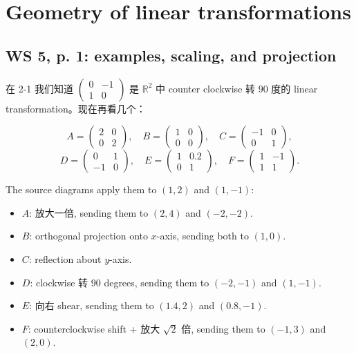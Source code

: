 \chapter{Geometry of linear transformations}

\section{WS 5, p. 1: examples, scaling, and projection}

在 2-1 我们知道 \(\begin{pmatrix}
0 & {- 1} \\
1 & 0
\end{pmatrix}\) 是 \(\mathbb{R}^{2}\) 中 counter clockwise 转 \(90\) 度的 linear transformation。现在再看几个：

\[A = \begin{pmatrix}
2 & 0 \\
0 & 2
\end{pmatrix},\quad B = \begin{pmatrix}
1 & 0 \\
0 & 0
\end{pmatrix},\quad C = \begin{pmatrix}
{- 1} & 0 \\
0 & 1
\end{pmatrix},\]\[D = \begin{pmatrix}
0 & 1 \\
{- 1} & 0
\end{pmatrix},\quad E = \begin{pmatrix}
1 & 0.2 \\
0 & 1
\end{pmatrix},\quad F = \begin{pmatrix}
1 & {- 1} \\
1 & 1
\end{pmatrix}.\]

The source diagrams apply them to \(\left( {1,2} \right)\) and \(\left( {1, - 1} \right)\):

\begin{itemize}
\tightlist
\item
  \(A\): 放大一倍, sending them to \(\left( {2,4} \right)\) and \(\left( {- 2, - 2} \right)\).
\item
  \(B\): orthogonal projection onto \(x\)-axis, sending both to \(\left( {1,0} \right)\).
\item
  \(C\): reflection about \(y\)-axis.
\item
  \(D\): clockwise 转 \(90\) degrees, sending them to \(\left( {- 2, - 1} \right)\) and \(\left( {1, - 1} \right)\).
\item
  \(E\): 向右 shear, sending them to \(\left( {1.4,2} \right)\) and \(\left( {0.8, - 1} \right)\).
\item
  \(F\): counterclockwise shift + 放大 \(\sqrt{2}\) 倍, sending them to \(\left( {- 1,3} \right)\) and \(\left( {2,0} \right)\).
\end{itemize}

